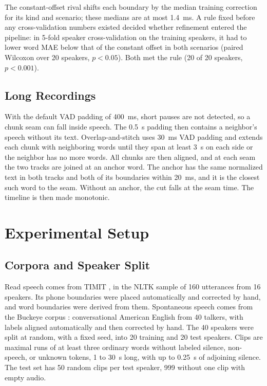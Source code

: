 \documentclass[conference,a4paper]{IEEEtran}
\begin{document}
The constant-offset rival shifts each boundary by the median training correction for its kind and scenario; these medians are at most 1.4~ms. A rule fixed before any cross-validation numbers existed decided whether refinement entered the pipeline: in 5-fold speaker cross-validation on the training speakers, it had to lower word MAE below that of the constant offset in both scenarios (paired Wilcoxon over 20 speakers, $p<0.05$). Both met the rule (20 of 20 speakers, $p<0.001$).

\subsection{Long Recordings}\label{sec:long}
With the default VAD padding of 400~ms, short pauses are not detected, so a chunk seam can fall inside speech. The 0.5~s padding then contains a neighbor's speech without its text. Overlap-and-stitch uses 30~ms VAD padding and extends each chunk with neighboring words until they span at least 3~s on each side or the neighbor has no more words. All chunks are then aligned, and at each seam the two tracks are joined at an anchor word. The anchor has the same normalized text in both tracks and both of its boundaries within 20~ms, and it is the closest such word to the seam. Without an anchor, the cut falls at the seam time. The timeline is then made monotonic.

\section{Experimental Setup}
\subsection{Corpora and Speaker Split}
Read speech comes from TIMIT \cite{Garofolo1993}, in the NLTK sample of 160 utterances from 16 speakers. Its phone boundaries were placed automatically and corrected by hand, and word boundaries were derived from them. Spontaneous speech comes from the Buckeye corpus \cite{Pitt2005}: conversational American English from 40 talkers, with labels aligned automatically and then corrected by hand. The 40 speakers were split at random, with a fixed seed, into 20 training and 20 test speakers. Clips are maximal runs of at least three ordinary words without labeled silence, non-speech, or unknown tokens, 1 to 30~s long, with up to 0.25~s of adjoining silence. The test set has 50 random clips per test speaker, 999 without one clip with empty audio.
\end{document}
